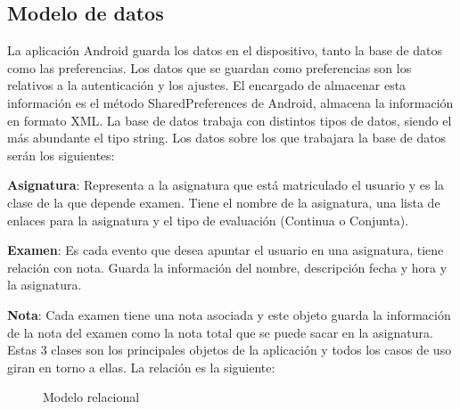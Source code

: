 \subsection{Modelo de datos}
\label{subsecc:modelo de datos}

La aplicación Android guarda los datos en el dispositivo, tanto la base de datos como las preferencias.
Los datos que se guardan como preferencias son los relativos a la autenticación y los ajustes. El encargado de almacenar esta información es el método SharedPreferences de Android, almacena la información en formato XML.
La base de datos trabaja con distintos tipos de datos, siendo el más abundante el tipo string.
Los datos sobre los que trabajara la base de datos serán los siguientes:

\textbf{Asignatura}: Representa a la asignatura que está matriculado el usuario y es la clase de la que depende examen. Tiene el nombre de la asignatura, una  lista de enlaces para la asignatura  y el tipo de evaluación (Continua o Conjunta).

\textbf{Examen}: Es cada evento que desea apuntar el usuario en una asignatura, tiene relación con nota. Guarda la información del nombre, descripción fecha y hora y la asignatura.

\textbf{Nota}: Cada examen tiene una nota asociada y este objeto guarda la información de la nota del examen como la nota total que se puede sacar en la asignatura.
Estas 3 clases son los principales objetos de la aplicación y todos los casos de uso giran en torno a ellas.
La relación es la siguiente:

\begin{figure}[H] 
  \begin{center} 
    \caption{Modelo relacional} 
    \label{fig:ModeloRelacional} 
  \end{center} 
\end{figure}

